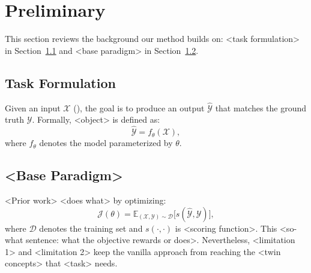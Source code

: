 \section{Preliminary} \label{sec:preliminary}
This section reviews the background our method builds on: <task formulation> in Section~\ref{sec:task-formulation} and <base paradigm> in Section~\ref{sec:base-paradigm}.

\subsection{Task Formulation} \label{sec:task-formulation}
Given an input $\mathcal{X}$ (), the goal is to produce an output $\hat{\mathcal{Y}}$ that matches the ground truth $\mathcal{Y}$.
Formally, <object> is defined as:
\begin{equation} \label{eq:task}
    \hat{\mathcal{Y}} = f_\theta(\mathcal{X}),
\end{equation}
where $f_\theta$ denotes the model parameterized by $\theta$.

\subsection{<Base Paradigm>} \label{sec:base-paradigm}
<Prior work> \citep{Placeholder-A} <does what> by optimizing:
\begin{equation} \label{eq:base-objective}
    \mathcal{J}(\theta) = \mathbb{E}_{(\mathcal{X}, \mathcal{Y}) \sim \mathcal{D}} \big[ s(\hat{\mathcal{Y}}, \mathcal{Y}) \big],
\end{equation}
where $\mathcal{D}$ denotes the training set and $s(\cdot,\cdot)$ is <scoring function>.
This <so-what sentence: what the objective rewards or does>.
Nevertheless, <limitation 1> and <limitation 2> keep the vanilla approach from reaching the <twin concepts> that <task> needs.
